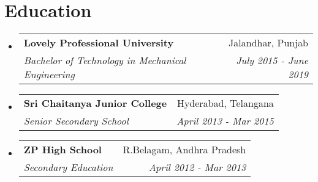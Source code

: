 \documentclass[letterpaper,11pt]{article}
\makeatletter
\newcommand{\resumeSubheading}[4]{
  \vspace{-2pt}\item
    \begin{tabular*}{0.97\textwidth}[t]{l@{\extracolsep{\fill}}r}
      \textbf{#1} & #2 \\
      \textit{\small#3} & \textit{\small #4} \\
    \end{tabular*}\vspace{-7pt}
}
\newcommand{\resumeSubHeadingListStart}{\begin{itemize}[leftmargin=0.15in, label={}]}
\newcommand{\resumeSubHeadingListEnd}{\end{itemize}}
\makeatother
\begin{document}
\section{Education}
  \resumeSubHeadingListStart
    \resumeSubheading
      {Lovely Professional University}{Jalandhar, Punjab}
      {Bachelor of Technology in Mechanical Engineering}{July 2015 - June 2019}
      \resumeSubheading
      {Sri Chaitanya Junior College}{Hyderabad, Telangana}
      {Senior Secondary School}{April 2013 - Mar 2015}
      \resumeSubheading
      {ZP High School}{R.Belagam, Andhra Pradesh}
      {Secondary Education}{April 2012 - Mar 2013}
    
  \resumeSubHeadingListEnd

%
\end{document}
